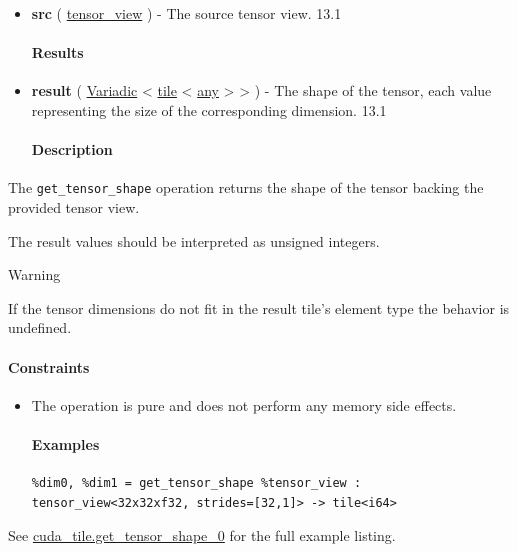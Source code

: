 \documentclass{article}
\begin{document}
\begin{itemize}
\item \textbf{src} ( \href{https://docs.nvidia.com/cuda/tile-ir/latest/sections/types.html#type-tensor-view}{tensor\_view} ) - The source tensor view. 13.1


\paragraph{Results}

\item \textbf{result} ( \href{https://docs.nvidia.com/cuda/tile-ir/latest/sections/operations.html#type-variadic}{Variadic} < \href{https://docs.nvidia.com/cuda/tile-ir/latest/sections/types.html#type-tile}{tile} < \href{https://docs.nvidia.com/cuda/tile-ir/latest/sections/operations.html#type-any}{any} > > ) - The shape of the tensor, each value representing the size of the corresponding dimension. 13.1


\paragraph{Description}

\end{itemize}
The \texttt{get\_tensor\_shape} operation returns the shape of the tensor backing the provided tensor view.


The result values should be interpreted as unsigned integers.


Warning


If the tensor dimensions do not fit in the result tile's element type the behavior is undefined.



\paragraph{Constraints}

\begin{itemize}
\item The operation is pure and does not perform any memory side effects.


\paragraph{Examples}

\begin{lstlisting}
%dim0, %dim1 = get_tensor_shape %tensor_view : tensor_view<32x32xf32, strides=[32,1]> -> tile<i64>
\end{lstlisting}

\end{itemize}
See \href{https://docs.nvidia.com/cuda/tile-ir/latest/sections/appendix.html#example-cuda-tile-get-tensor-shape-0}{cuda\_tile.get\_tensor\_shape\_0} for the full example listing.
\end{document}
